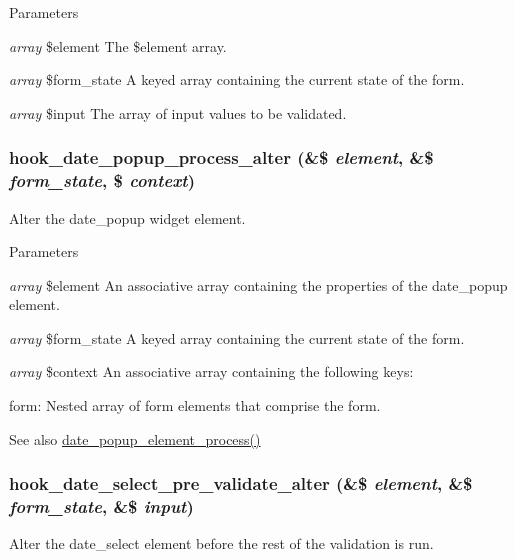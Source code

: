 \begin{DoxyParams}{Parameters}
\item[{\em array}]\$element The \$element array. \item[{\em array}]\$form\_\-state A keyed array containing the current state of the form. \item[{\em array}]\$input The array of input values to be validated. \end{DoxyParams}
\hypertarget{date_8api_8php_a8b0b96439de62930ff766eb159d044cb}{
\subsubsection[{hook\_\-date\_\-popup\_\-process\_\-alter}]{\setlength{\rightskip}{0pt plus 5cm}hook\_\-date\_\-popup\_\-process\_\-alter (\&\$ {\em element}, \/  \&\$ {\em form\_\-state}, \/  \$ {\em context})}}
\label{date_8api_8php_a8b0b96439de62930ff766eb159d044cb}
Alter the date\_\-popup widget element.


\begin{DoxyParams}{Parameters}
\item[{\em array}]\$element An associative array containing the properties of the date\_\-popup element. \item[{\em array}]\$form\_\-state A keyed array containing the current state of the form. \item[{\em array}]\$context An associative array containing the following keys:
\begin{DoxyItemize}
\item form: Nested array of form elements that comprise the form.
\end{DoxyItemize}\end{DoxyParams}
\begin{DoxySeeAlso}{See also}
\hyperlink{date__popup_8module_a1c48e05ba3b84ea7170f70091a3893d2}{date\_\-popup\_\-element\_\-process()} 
\end{DoxySeeAlso}
\hypertarget{date_8api_8php_a8fa3364916ca73163501f3b9fa319dd6}{
\subsubsection[{hook\_\-date\_\-select\_\-pre\_\-validate\_\-alter}]{\setlength{\rightskip}{0pt plus 5cm}hook\_\-date\_\-select\_\-pre\_\-validate\_\-alter (\&\$ {\em element}, \/  \&\$ {\em form\_\-state}, \/  \&\$ {\em input})}}
\label{date_8api_8php_a8fa3364916ca73163501f3b9fa319dd6}
Alter the date\_\-select element before the rest of the validation is run.


